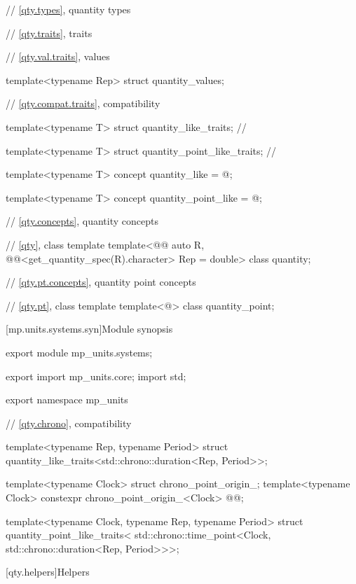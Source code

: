 \begin{codeblock}
{// \ref{qty.types}, quantity types

// \ref{qty.traits}, traits

// \ref{qty.val.traits}, values

template<typename Rep>
struct quantity_values;

// \ref{qty.compat.traits}, compatibility

template<typename T>
struct quantity_like_traits; // \notdef

template<typename T>
struct quantity_point_like_traits; // \notdef

template<typename T>
concept quantity_like = @\seebelownc@;

template<typename T>
concept quantity_point_like = @\seebelownc@;

// \ref{qty.concepts}, quantity concepts

// \ref{qty}, class template 
template<@@ auto R, @@<get_quantity_spec(R).character> Rep = double>
class quantity;

// \ref{qty.pt.concepts}, quantity point concepts

// \ref{qty.pt}, class template 
template<@\unspec@>
class quantity_point;

}
\end{codeblock}

[mp.units.systems.syn]{Module  synopsis}
%
\begin{codeblock}
export module mp_units.systems;

export import mp_units.core;
import std;

export namespace mp_units {

// \ref{qty.chrono},  compatibility

template<typename Rep, typename Period>
struct quantity_like_traits<std::chrono::duration<Rep, Period>>;

template<typename Clock>
struct chrono_point_origin_;
template<typename Clock>
constexpr chrono_point_origin_<Clock> @@{};

template<typename Clock, typename Rep, typename Period>
struct quantity_point_like_traits<
  std::chrono::time_point<Clock, std::chrono::duration<Rep, Period>>>;

}
\end{codeblock}

[qty.helpers]{Helpers}

